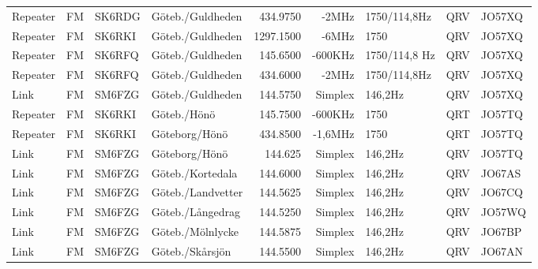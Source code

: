 \begin{landscape}
\begin{longtable}{llllrrlcl}
	Repeater          & FM           & SK6RDG        & Göteb./Guldheden    &          434.9750 &          -2MHz & 1750/114,8Hz    &       QRV       & JO57XQ           \\
	Repeater          & FM           & SK6RKI        & Göteb./Guldheden    &         1297.1500 &          -6MHz & 1750            &       QRV       & JO57XQ           \\
	Repeater          & FM           & SK6RFQ        & Göteb./Guldheden    &          145.6500 &        -600KHz & 1750/114,8 Hz   &       QRV       & JO57XQ           \\
	Repeater          & FM           & SK6RFQ        & Göteb./Guldheden    &          434.6000 &          -2MHz & 1750/114,8Hz    &       QRV       & JO57XQ           \\
	Link              & FM           & SM6FZG        & Göteb./Guldheden    &          144.5750 &        Simplex & 146,2Hz         &       QRV       & JO57XQ           \\
	Repeater          & FM           & SK6RKI        & Göteb./Hönö         &          145.7500 &        -600KHz & 1750            &       QRT       & JO57TQ           \\
	Repeater          & FM           & SK6RKI        & Göteborg/Hönö       &          434.8500 &        -1,6MHz & 1750            &       QRT       & JO57TQ           \\
	Link              & FM           & SM6FZG        & Göteborg/Hönö       &           144.625 &        Simplex & 146,2Hz         &       QRV       & JO57TQ           \\
	Link              & FM           & SM6FZG        & Göteb./Kortedala    &          144.6000 &        Simplex & 146,2Hz         &       QRV       & JO67AS           \\
	Link              & FM           & SM6FZG        & Göteb./Landvetter   &          144.5625 &        Simplex & 146,2Hz         &       QRV       & JO67CQ           \\
	Link              & FM           & SM6FZG        & Göteb./Långedrag    &          144.5250 &        Simplex & 146,2Hz         &       QRV       & JO57WQ           \\
	Link              & FM           & SM6FZG        & Göteb./Mölnlycke    &          144.5875 &        Simplex & 146,2Hz         &       QRV       & JO67BP           \\
	Link              & FM           & SM6FZG        & Göteb./Skårsjön     &          144.5500 &        Simplex & 146,2Hz         &       QRV       & JO67AN           \\

\end{longtable}
\end{landscape}
